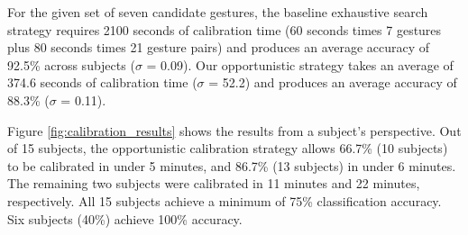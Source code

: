 
For the given set of seven candidate gestures, the baseline exhaustive search strategy requires 2100 seconds of calibration time (60 seconds times 7 gestures plus 80 seconds times 21 gesture pairs) and produces an average accuracy of 92.5\% across subjects (\textit{$\sigma$} = 0.09). Our opportunistic strategy takes an average of 374.6 seconds of calibration time (\textit{$\sigma$} = 52.2) and produces an average accuracy of 88.3\% (\textit{$\sigma$} = 0.11).

Figure \ref{fig:calibration_results} shows the results from a subject's perspective. Out of 15 subjects, the opportunistic calibration strategy allows 66.7\% (10 subjects) to be calibrated in under 5 minutes, and 86.7\% (13 subjects) in under 6 minutes. The remaining two subjects were calibrated in 11 minutes and 22 minutes, respectively. All 15 subjects achieve a minimum of 75\% classification accuracy. Six subjects (40\%) achieve 100\% accuracy.

